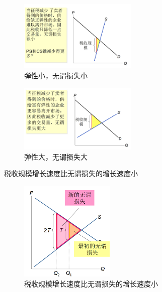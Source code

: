 \documentclass[12pt, a4paper]{article}
\begin{document}
\begin{figure}[H] 
  \centering %
  \includegraphics[width=0.5\textwidth]{弹性小，无谓损失小.png} 
  \caption{弹性小，无谓损失小} %
\end{figure}
\begin{figure}[H] 
  \centering %
  \includegraphics[width=0.5\textwidth]{弹性大，无谓损失大.png} 
  \caption{弹性大，无谓损失大} %
\end{figure}

税收规模增长速度比无谓损失的增长速度小
\begin{figure}[H] 
  \centering %
  \includegraphics[width=0.4\textwidth]{税收规模与无谓损失.png} 
  \caption{税收规模增长速度比无谓损失的增长速度小} %
\end{figure}
\end{document}
